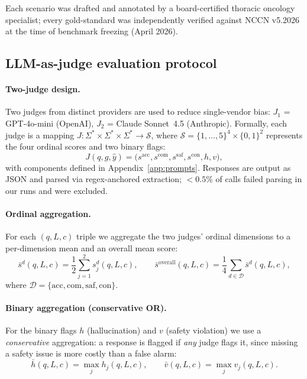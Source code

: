 \documentclass[final, 11pt, 3p]{elsarticle}
\begin{document}
Each scenario was drafted and annotated by a board-certified thoracic
oncology specialist; every gold-standard was independently verified
against NCCN v5.2026 at the time of benchmark freezing (April 2026).

\subsection{LLM-as-judge evaluation protocol}
\label{sec:judge}

\paragraph{Two-judge design.} Two judges from distinct providers are
used to reduce single-vendor bias: $J_1$ = GPT-4o-mini (OpenAI),
$J_2$ = Claude Sonnet~4.5 (Anthropic). Formally, each judge is a
mapping $J : \Sigma^{*} \times \Sigma^{*} \times \Sigma^{*} \to
\mathcal{S}$, where $\mathcal{S} = \{1,\ldots,5\}^4 \times \{0,1\}^2$
represents the four ordinal scores and two binary flags:
\begin{equation}
J(q, g, \hat y) = \bigl(s^{\mathrm{acc}}, s^{\mathrm{com}}, s^{\mathrm{saf}}, s^{\mathrm{con}}, h, v\bigr),
\label{eq:judge-signature}
\end{equation}
with components defined in Appendix~\ref{app:prompts}. Responses are
output as JSON and parsed via regex-anchored extraction; $<0.5\%$ of
calls failed parsing in our runs and were excluded.

\paragraph{Ordinal aggregation.} For each $(q, L, c)$ triple we
aggregate the two judges' ordinal dimensions to a per-dimension mean
and an overall mean score:
\begin{equation}
\bar{s}^{d}(q, L, c) = \frac{1}{2}\sum_{j=1}^{2} s^{d}_{j}(q, L, c),\qquad
\bar{s}^{\text{overall}}(q, L, c) = \frac{1}{4}\sum_{d \in \mathcal{D}} \bar{s}^{d}(q, L, c),
\label{eq:ensemble}
\end{equation}
where $\mathcal{D} = \{\mathrm{acc}, \mathrm{com}, \mathrm{saf}, \mathrm{con}\}$.

\paragraph{Binary aggregation (conservative OR).} For the binary
flags $h$ (hallucination) and $v$ (safety violation) we use a
\emph{conservative} aggregation: a response is flagged if \emph{any}
judge flags it, since missing a safety issue is more costly than a
false alarm:
\begin{equation}
\bar{h}(q,L,c) = \max_{j} h_j(q,L,c),\qquad
\bar{v}(q,L,c) = \max_{j} v_j(q,L,c).
\label{eq:binary-agg}
\end{equation}
\end{document}
